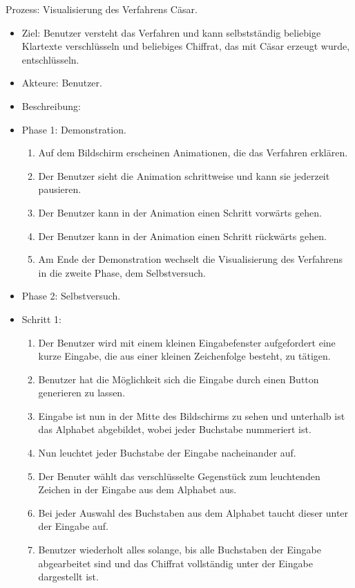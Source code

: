 \documentclass{article}
\begin{document}
\begin{FA}[start=110]
 \item Prozess: Visualisierung des Verfahrens Cäsar.
\end{FA}
\begin{itemize}[label={}]
 \item Ziel: Benutzer versteht das Verfahren und kann selbstständig 
 beliebige Klartexte verschlüsseln und beliebiges Chiffrat, das mit Cäsar erzeugt wurde, entschlüsseln.
 \item Akteure: Benutzer.
 \item Beschreibung:
 \item Phase 1: Demonstration.
\begin{enumerate}[]
 \item Auf dem Bildschirm erscheinen Animationen, die das Verfahren erklären.
 \item Der Benutzer sieht die Animation schrittweise und kann sie jederzeit pausieren.
 \item Der Benutzer kann in der Animation einen Schritt vorwärts gehen.
 \item Der Benutzer kann in der Animation einen Schritt rückwärts gehen. 
 \item Am Ende der Demonstration wechselt die Visualisierung des Verfahrens in die zweite Phase, dem Selbstversuch.
\end{enumerate}
 \item Phase 2: Selbstversuch.
 \item Schritt 1:
 \begin{enumerate}
  \item Der Benutzer wird mit einem kleinen Eingabefenster aufgefordert eine kurze Eingabe, 
        die aus einer kleinen Zeichenfolge besteht, zu tätigen.
  \item Benutzer hat die Möglichkeit sich die Eingabe durch einen Button generieren zu lassen.
  \item Eingabe ist nun in der Mitte des Bildschirms zu sehen und unterhalb ist das Alphabet 
        abgebildet, wobei jeder Buchstabe nummeriert ist.     
  \item Nun leuchtet jeder Buchstabe der Eingabe nacheinander auf.
  \item Der Benuter wählt das verschlüsselte Gegenstück zum leuchtenden Zeichen in der Eingabe aus dem Alphabet aus. 
  \item Bei jeder Auswahl des Buchstaben aus dem Alphabet taucht dieser unter der Eingabe auf.
  \item[] Benutzer wiederholt alles solange, bis alle Buchstaben der Eingabe abgearbeitet sind und das Chiffrat vollständig unter der Eingabe dargestellt ist.

\end{enumerate}
\end{itemize}
\end{document}
